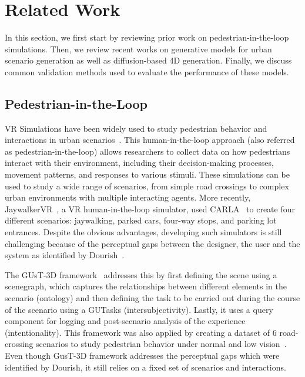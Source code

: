 \documentclass{article}
\begin{document}
\section{Related Work}

In this section, we first start by reviewing prior work on pedestrian-in-the-loop simulations. Then, we review recent works on generative models for urban scenario generation as well as diffusion-based 4D generation. Finally, we discuss common validation methods used to evaluate the performance of these models.

\subsection{Pedestrian-in-the-Loop}

VR Simulations have been widely used to study pedestrian behavior and interactions in urban scenarios~\cite{wu2018using,tran2021review,mukoya2024jaywalkervr,schneider2020virtually}. This human-in-the-loop approach (also referred as pedestrian-in-the-loop\cite{hartmann2017pedestrian}) allows researchers to collect data on how pedestrians interact with their environment, including their decision-making processes, movement patterns, and responses to various stimuli. These simulations can be used to study a wide range of scenarios, from simple road crossings to complex urban environments with multiple interacting agents. More recently, JaywalkerVR~\cite{mukoya2024jaywalkervr}, a VR human-in-the-loop simulator, used CARLA~\cite{dosovitskiy2017carla} to create four different scenarios: jaywalking, parked cars, four-way stops, and parking lot entrances. Despite the obvious advantages, developing such simulators is still challenging because of the perceptual gaps between the designer, the user and the system as identified by Dourish~\cite{dourish2001action}.

The GUsT-3D framework~\cite{wu2022designing} addresses this by first defining the scene using a scenegraph, which captures the relationships between different elements in the scenario (ontology) and then defining the task to be carried out during the course of the scenario using a GUTasks (intersubjectivity). Lastly, it uses a query component for logging and post-scenario analysis of the experience (intentionality). This framework was also applied by creating a dataset of 6 road-crossing scenarios to study pedestrian behavior under normal and low vision~\cite{wu2023exploring}. Even though GusT-3D framework addresses the perceptual gaps which were identified by Dourish, it still relies on a fixed set of scenarios and interactions.
\end{document}
